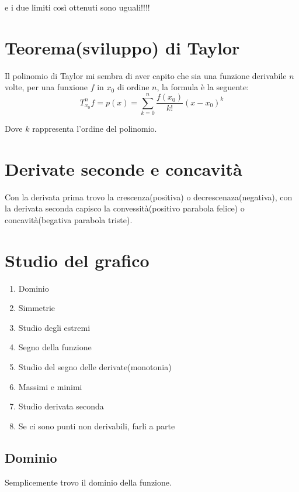 \documentclass{article}
\begin{document}
    e i due limiti così ottenuti sono uguali!!!!

    \section{Teorema(sviluppo) di Taylor}

    Il polinomio di Taylor mi sembra di aver capito che sia una funzione derivabile $n$ volte, 
    per una funxione $f$ in $x_0$ di ordine $n$, la formula è la seguente:
    \begin{equation*}
        T_{x_0}^n f = p(x) = \sum_{k=0}^n \frac{f(x_0)}{k!}(x-x_0)^k
    \end{equation*}

    Dove $k$ rappresenta l'ordine del polinomio.


    \section{Derivate seconde e concavità}

    Con la derivata prima trovo la crescenza(positiva) o decrescenaza(negativa), con la derivata seconda capisco la convessità(positivo parabola felice) o concavità(begativa parabola triste).

    \section{Studio del grafico}
    

    \begin{enumerate}
        \item Dominio
        \item Simmetrie
        \item Studio degli estremi
        \item Segno della funzione
        \item Studio del segno delle derivate(monotonia)
        \item Massimi e minimi
        \item Studio derivata seconda
        \item Se ci sono punti non derivabili, farli a parte
    \end{enumerate}

    \subsection{Dominio}
    Semplicemente trovo il dominio della funzione.
\end{document}

